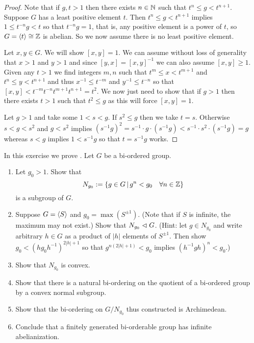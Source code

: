 \begin{proof}
    Note that if $g, t > 1$ then there exists $n \in \mathbb{N}$ such that $t^n \leq g < t^{n+1}$.
    Suppose $G$ has a least positive element $t$.
    Then $t^n \leq g < t^{n+1}$ implies $1 \leq t^{-n} g < t$ so that $t^{-n} g = 1$, that is, any positive element is a power of $t$, so $G = \langle t \rangle \cong \mathbb{Z}$ is abelian.
    So we now assume there is no least positive element.

    Let $x, y \in G$.
    We will show $[x, y] = 1$.
    We can assume without loss of generality that $x > 1$ and $y > 1$ and since $[y, x] = [x, y]^{-1}$ we can also assume $[x, y] \geq 1$.
    Given any $t > 1$ we find integers $m, n$ such that $t^m \leq x < t^{m+1}$ and $t^n \leq y < t^{n+1}$ and thus $x^{-1} \leq t^{-m}$ and $y^{-1} \leq t^{-n}$ so that $[x, y] < t^{-m} t^{-n} t^{m+1} t^{n+1} = t^2$.
    We now just need to show that if $g > 1$ then there exists $t > 1$ such that $t^2 \leq g$ as this will force $[x, y] = 1$.

    Let $g > 1$ and take some $1 < s < g$.
    If $s^2 \leq g$ then we take $t = s$.
    Otherwise $s < g < s^2$ and $g < s^2$ implies $(s^{-1} g)^2 = s^{-1} \cdot g \cdot (s^{-1} g) < s^{-1} \cdot s^2 \cdot (s^{-1} g) = g$ whereas $s < g$ implies $1 < s^{-1} g$ so that $t = s^{-1} g$ works.
\end{proof}

\begin{exercise}
    In this exercise we prove .
    Let $G$ be a bi-ordered group.
    \begin{enumerate}
        \item Let $g_0 > 1$.
            Show that \[
                N_{g_0} := \left\{ g \in G \,\middle|\, g^n < g_0 \quad \forall n \in \mathbb{Z} \right\}
            \] is a subgroup of $G$.
        \item Suppose $G = \langle S \rangle$ and $g_0 = \max(S^{\pm 1})$.
            (Note that if $S$ is infinite, the maximum may not exist.)
            Show that $N_{g_0} \vartriangleleft G$.
            (Hint: let $g \in N_{g_0}$ and write arbitrary $h \in G$ as a product of $|h|$ elements of $S^{\pm 1}$.
            Then show $g_0 < (h g_0 h^{-1})^{2|h| + 1}$ so that $g^{n(2|h| + 1)} < g_0$ implies $(h^{-1} g h)^n < g_0$.)
        \item Show that $N_{g_0}$ is convex.
        \item Show that there is a natural bi-ordering on the quotient of a bi-ordered group by a convex normal subgroup.
        \item Show that the bi-ordering on $G / N_{g_0}$ thus constructed is Archimedean.
        \item Conclude that a finitely generated bi-orderable group has infinite abelianization.
    \end{enumerate}
\end{exercise}

